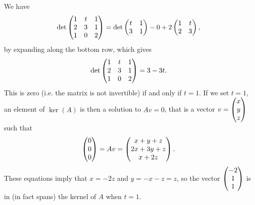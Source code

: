\documentclass{article}
\begin{document}
\begin{Solution}\label{sol:exr:routine3}
We have \[\det\begin{pmatrix} 1 & t & 1 \\ 2 & 3 & 1 \\ 1 & 0 & 2\end{pmatrix}=\det\begin{pmatrix} t &
1 \\ 3 & 1 \end{pmatrix}-0+2\begin{pmatrix} 1 & t \\ 2 & 3\end{pmatrix},\] by expanding along the
bottom row, which gives \[\det\begin{pmatrix} 1 & t & 1 \\ 2 & 3 & 1 \\ 1 & 0 &
2\end{pmatrix}=3-3t.\] This is zero (i.e. the matrix is not invertible) if and
only if \(t=1\). If we set \(t=1\), an element of \(\ker(A)\) is
then a solution to \(Av=0\), that is a vector \(v=\begin{pmatrix} x
\\ y\\ z\end{pmatrix}\) such that \[\begin{pmatrix} 0 \\ 0 \\ 0\end{pmatrix}=Av=\begin{pmatrix} x+y+z\\ 2x+3y+z
\\ x+2z\end{pmatrix}.\] These equations imply that \(x=-2z\) and \(y=-x-z=z\),
so the vector \(\begin{pmatrix} -2 \\ 1 \\ 1\end{pmatrix}\) is in (in fact spans) the
kernel of \(A\) when \(t=1\). \qedhere






\end{Solution}
\end{document}
